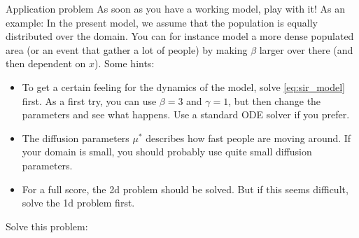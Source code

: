 \begin{railingbox}{Application problem}
  As soon as you have a working model, play with it! As an example: In the present model, we assume that the population is equally distributed over the domain. You can for instance model a more dense populated area (or an event that gather a lot of people) by making \(\beta\) larger over there (and then dependent on \(x\)).
  Some hints:
  \begin{itemize}
    \item To get a certain feeling for the dynamics of the model, solve \eqref{eq:sir_model} first. As a first try, you can use \(\beta = 3\) and \(\gamma = 1\), but then change the parameters and see what happens. Use a standard ODE solver if you prefer.
    \item The diffusion parameters \(\mu^*\) describes how fast people are moving around. If your domain is small, you should probably use quite small diffusion parameters.
    \item For a full score, the 2d problem should be solved. But if this seems difficult, solve the 1d problem first.
  \end{itemize}
\end{railingbox}
Solve this problem:




